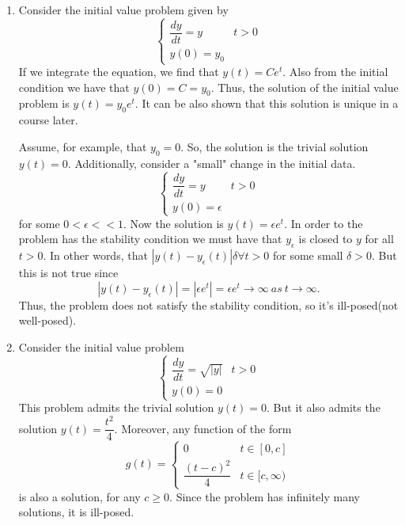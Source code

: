 \documentclass[main.tex]{subfiles}
\begin{document}
\begin{example}
    \begin{enumerate}
        \item Consider the initial value problem given by 
        $$\begin{cases}
            \dfrac{dy}{dt} = y & t > 0 \\
            y(0) = y_0
        \end{cases}$$
        If we integrate the equation, we find that $y(t) = Ce^t$. Also from the initial condition we have that $y(0) = C = y_0$. Thus, the solution of the initial value problem is $y(t) = y_0 e^t$. It can be also shown that this solution is unique in a course later. 
        \par Assume, for example, that $y_0 = 0$. So, the solution is the trivial solution $y(t) = 0$. Additionally, consider a "small" change in the initial data. 
        $$
        \begin{cases}
            \dfrac{dy}{dt} = y & t > 0 \\
            y(0) = \epsilon
        \end{cases}
        $$ 
        for some $0< \epsilon << 1$. Now the solution is $y(t) = \epsilon e^t$. In order to the problem has the stability condition we must have that $y_{\epsilon}$ is closed to $y$ for all $t > 0$. In other words, that $|y(t) - y_{\epsilon}(t)| \delta \forall t > 0$ for some small $\delta > 0$. But this is not true since 
        $$
        |y(t) - y_{\epsilon}(t)| = |\epsilon e^t| = \epsilon e^t \to \infty \ as \ t \to \infty.
        $$
        Thus, the problem does not satisfy the stability condition, so it's ill-posed(not well-posed). 
        \item Consider the initial value problem 
        $$
        \begin{cases}
            \dfrac{dy}{dt} = \sqrt{|y|} & t > 0 \\
            y(0) = 0
        \end{cases}
        $$ 
        This problem admits the trivial solution $y(t) = 0$. But it also admits the solution $y(t) = \dfrac{t^2}{4}$. Moreover, any function of the form 
        $$
        g(t) = \begin{cases}
            0 & t \in [0, c] \\
            \dfrac{(t-c)^2}{4} & t \in [c, \infty)
        \end{cases}
        $$
        is also a solution, for any $c \geq 0$. Since the problem has infinitely many solutions, it is ill-posed. 
    \end{enumerate}
\end{example}
\end{document}

